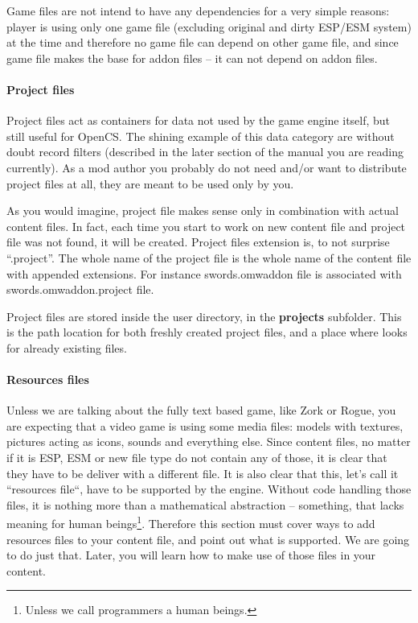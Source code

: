 Game files are not intend to have any dependencies for a very simple reasons: player is using only one game file (excluding original
and dirty {ESP/ESM} system) at the time and therefore no game file can depend on other game file, and since game file makes the base
for addon files -- it can not depend on addon files.

\paragraph{Project files}
Project files act as containers for data not used by the \OMW{} game engine itself, but still useful for OpenCS. The shining example
of this data category are without doubt record filters (described in the later section of the manual you are reading currently).
As a mod author you probably do not need and/or want to distribute project files at all, they are meant to be used only by you.

As you would imagine, project file makes sense only in combination with actual content files. In fact, each time you start to work
on new content file and project file was not found, it will be created.
Project files extension is, to not surprise ``.project''. The whole name of the project file is the whole name of the content file
with appended extensions. For instance swords.omwaddon file is associated with swords.omwaddon.project file.

Project files are stored inside the user directory, in the \textbf{projects} subfolder. This is the path location for both freshly
created project files, and a place where \OCS{} looks for already existing files.

\paragraph{Resources files}
Unless we are talking about the fully text based game, like Zork or Rogue, you are expecting that a video game is using some media files:
models with textures, pictures acting as icons, sounds and everything else. Since content files, no matter if it is ESP, ESM or new \OMW{}
file type do not contain any of those, it is clear that they have to be deliver with a different file. It is also clear that this,
let's call it ``resources file``, have to be supported by the engine. Without code handling those files, it is nothing more than
a mathematical abstraction -- something, that lacks meaning for human beings\footnote{Unless we call programmers a human beings.}.
Therefore this section must cover ways to add resources files to your content file, and point out what is supported. We are going
to do just that. Later, you will learn how to make use of those files in your content.


